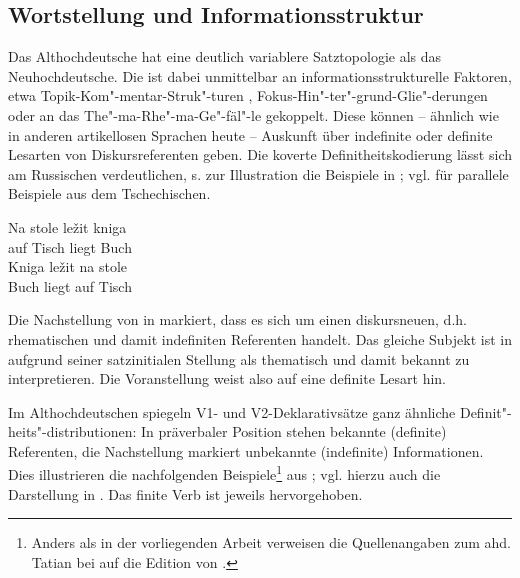 \subsection{Wortstellung und Informationsstruktur} \label{is-ahd.}

Das Althochdeutsche hat eine deutlich variablere Satztopologie als das Neuhochdeutsche. Die  ist dabei unmittelbar an informationsstrukturelle  Faktoren, etwa Topik-Kom"-mentar-Struk"-turen
\parencite{Hinterholzl2005,Ramers2005,Solf2008}, Fokus-Hin"-ter"-grund-Glie"-derungen \parencite{Petrova2009} oder an das The"-ma-Rhe"-ma-Ge"-fäl"-le \parencite{Leiss2000} gekoppelt. Diese können -- ähnlich wie in anderen artikellosen Sprachen heute -- Auskunft über indefinite  oder definite  Lesarten von Diskursreferenten geben. Die koverte Definitheitskodierung  lässt sich am Russischen verdeutlichen, s. zur Illustration die Beispiele in  \parencite[s.][191]{Szczepaniak2015};  vgl.  \textcite[5]{Leiss2000} für parallele Beispiele aus dem Tschechischen. 

\begin{exe}
\settowidth{}
	\ex \label{ex:is}   
	\begin{xlist}
		\ex \label{ex:is-indef} 
		\gll Na stole ležit kniga\\
		auf Tisch liegt Buch\\
		\trans {}
		\ex \label{ex:is-def} 
		\gll Kniga ležit na stole\\
		Buch liegt auf Tisch\\
		\trans {}
	\end{xlist}
\end{exe}

\noindent
Die Nachstellung von  in  markiert, dass es sich um einen diskursneuen, d.h. rhematischen  und damit indefiniten Referenten  handelt. Das gleiche Subjekt  ist in  aufgrund seiner satzinitialen Stellung als thematisch  und damit bekannt zu interpretieren. Die Voranstellung  weist also auf eine definite Lesart hin.

Im Althochdeutschen spiegeln V1- und V2-Deklarativsätze ganz ähnliche Definit"-heits"-distributionen: In präverbaler Position stehen bekannte (definite) Referenten, die Nachstellung markiert unbekannte (indefinite)  Informationen. Dies illustrieren die nachfolgenden Beispiele\footnote{Anders als in der vorliegenden Arbeit verweisen die Quellenangaben zum ahd. Tatian bei \textcite{Hinterholzl2010} auf die Edition von \textcite{Masser1994}.} aus \textcite[316]{Hinterholzl2010}; vgl. hierzu auch die Darstellung in \textcite[46--47]{Ferraresi2014}. Das finite Verb ist jeweils hervorgehoben.

